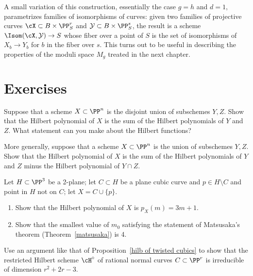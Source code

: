 A small variation of this construction, essentially the case $g=h$
and $d=1$, parametrizes families of
isomorphisms of curves: given two families of projective curves $\cX
\subset B \times \PP^r_{S}$ and $\mathcal{Y} \subset B\times \PP^s_{S}$,
%
%
the result is a scheme $\Isom(\cX, \mathcal{Y}) \to S$ whose
fiber over a point of $S$ is the set of isomorphisms of $X_{b}\to Y_{b}$
for $b$ in the fiber over $s$.
This turns out to be useful in describing the properties of the moduli
space $M_{g}$ treated in the
next chapter.

\section{Exercises}

\begin{exercise}
\label{deg of disjoint union}
Suppose that a scheme $X\subset \PP^n$ is the disjoint union of subschemes
$Y,Z$. Show that the
Hilbert polynomial
of
$X$ is the sum of the Hilbert polynomials of $Y$ and $Z$. What statement
%
%
can you make about the
Hilbert functions?
\end{exercise}

\begin{exercise}
More generally, suppose that a scheme $X\subset \PP^n$ is the union of
subschemes $Y,Z$. Show that the Hilbert polynomial of
$X$ is the sum of the Hilbert polynomials of $Y$ and $Z$ minus the
Hilbert polynomial of $Y\cap Z$.
\end{exercise}

\begin{exercise}
Let $H \subset \PP^3$ be a 2-plane; let $C \subset H$ be a
plane cubic
%
%
curve and $p \in H \setminus C$ and point in $H$ not on $C$; let $X =
C \cup \{p\}$.
\begin{enumerate}
\item Show that the Hilbert polynomial of $X$ is $p_X(m) = 3m+1$.
\item Show that the smallest value of $m_0$ satisfying the statement of
Matsusaka's theorem (Theorem~\ref{matsusaka})
%
 is 4.
\end{enumerate}\label{tnih7.3}
\end{exercise}

\begin{exercise}
\label{rational normal hilbert}
Use an  argument like that of Proposition~\ref{hilb of twisted cubics}
to show that the restricted Hilbert scheme $\cH^\circ$ of rational normal
%
curves $C \subset \PP^r$ is irreducible of dimension $r^2+2r-3$.
\end{exercise}

